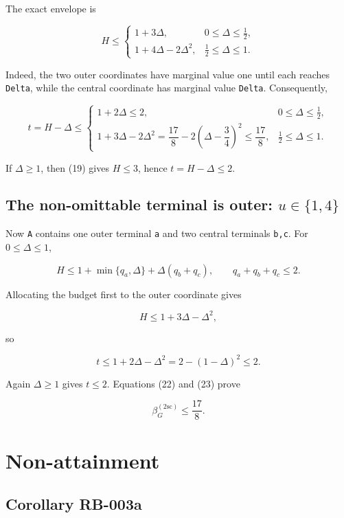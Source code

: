 \documentclass[
  11pt,
]{article}
\begin{document}
The exact envelope is

\[
H\le
\begin{cases}
1+3\Delta,&0\le\Delta\le\tfrac12,\\[1mm]
1+4\Delta-2\Delta^2,&\tfrac12\le\Delta\le1.
\end{cases}
\tag{21}
\]

Indeed, the two outer coordinates have marginal value one until each
reaches \texttt{Delta}, while the central coordinate has marginal value
\texttt{Delta}. Consequently,

\[
t=H-\Delta\le
\begin{cases}
1+2\Delta\le2,&0\le\Delta\le\tfrac12,\\[1mm]
1+3\Delta-2\Delta^2
=
\dfrac{17}{8}-2\left(\Delta-\dfrac34\right)^2
\le\dfrac{17}{8},
&\tfrac12\le\Delta\le1.
\end{cases}
\tag{22}
\]

If \(\Delta\ge1\), then (19) gives \(H\le3\), hence \(t=H-\Delta\le2\).

\subsection{\texorpdfstring{The non-omittable terminal is outer:
\(u\in\{1,4\}\)}{The non-omittable terminal is outer: u\textbackslash in\textbackslash\{1,4\textbackslash\}}}\label{the-non-omittable-terminal-is-outer-uin14}

Now \texttt{A} contains one outer terminal \texttt{a} and two central
terminals \texttt{b,c}. For \(0\le\Delta\le1\),

\[
H\le
1+\min\{q_a,\Delta\}+\Delta(q_b+q_c),
\qquad q_a+q_b+q_c\le2.
\]

Allocating the budget first to the outer coordinate gives

\[
H\le1+3\Delta-\Delta^2,
\]

so

\[
t\le1+2\Delta-\Delta^2
=2-(1-\Delta)^2
\le2.
\tag{23}
\]

Again \(\Delta\ge1\) gives \(t\le2\). Equations (22) and (23) prove

\[
\beta_G^{(2\mathrm{sc})}\le\frac{17}{8}.
\tag{24}
\]

\section{Non-attainment}\label{non-attainment}

\subsection{Corollary RB-003a}\label{corollary-rb-003a}
\end{document}

